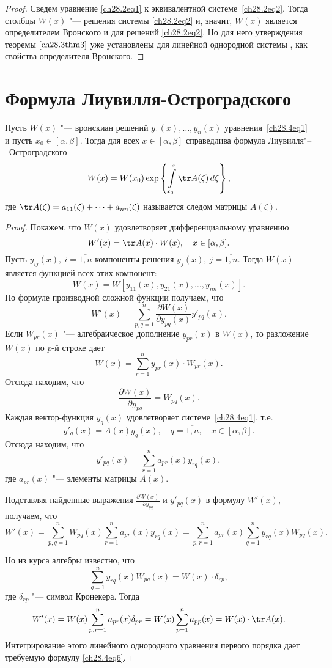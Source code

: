\begin{proof}
Сведем уравнение \eqref{ch28.2eq1} к эквивалентной системе~\eqref{ch28.2eq2}. Тогда столбцы $W(x)$ "--- решения системы \eqref{ch28.2eq2} и, значит, $W(x)$ является определителем Вронского и для решений \eqref{ch28.2eq2}. Но для него утверждения теоремы $\ref{ch28.3thm3}$ уже установлены для линейной однородной системы , как свойства определителя Вронского.
\end{proof}

\section{Формула Лиувилля-Остроградского}

\begin{thm}
Пусть $W(x)$ "--- вронскиан решений $y_1(x), \ldots, y_n(x)$ уравнения~\eqref{ch28.4eq1} и пусть $x_0 \in [\alpha, \beta]$. Тогда для всех $x \in [\alpha, \beta]$ справедлива формула Лиувилля"--~Остроградского
\begin{equation} \label{ch28.4eq6}
W(x) = W(x_0) \exp \left\lbrace \int\limits_{x_0}^{x} \tr A(\zeta) \,d\zeta \right\rbrace,
\end{equation}
где $\tr A(\zeta) = a_{11}(\zeta) + \cdots + a_{nn}(\zeta)$ называется следом матрицы $A(\zeta)$.
\end{thm}

\begin{proof}
Покажем, что $W(x)$ удовлетворяет дифференциальному уравнению
$$
W'(x) = \tr A(x) \cdot W(x), \quad x \in [\alpha, \beta].
$$
Пусть $y_{ij}(x),\ i = \overline{1,n}$ компоненты решения $y_j(x),\ j = \overline{1,n}$. Тогда $W(x)$ является функцией всех этих компонент:
$$
W(x) = W[y_{11}(x), y_{21}(x), \ldots, y_{nn}(x)].
$$
По формуле производной сложной функции получаем, что 
$$
W'(x) = \sum\limits_{p,q = 1}^{n} \frac{\partial W(x)}{\partial y_{pq}(x)} y'_{pq}(x).
$$
Если $W_{pr}(x)$ "--- алгебраическое дополнение $y_{pr}(x)$ в $W(x)$, то разложение $W(x)$ по $p$-й строке дает
$$
W(x) = \sum\limits_{r = 1}^{n} y_{pr}(x) \cdot W_{pr}(x).
$$
Отсюда находим, что 
$$
\frac{\partial W(x)}{\partial y_{pq}} = W_{pq}(x).
$$
Каждая вектор-функция $y_q(x)$ удовлетворяет системе~\eqref{ch28.4eq1}, т.е.
$$
y'_q(x) = A(x)y_q(x), \quad q = \overline{1,n}, \quad x \in [\alpha, \beta].
$$
Отсюда находим, что 
$$
y'_{pq}(x) = \sum\limits_{r = 1}^{n} a_{pr}(x)y_{rq}(x),
$$
где $a_{pr}(x)$ "--- элементы матрицы $A(x)$.

Подставляя найденные выражения $\frac{\partial W(x)}{\partial y_{pq}}$ и $y'_{pq}(x)$ в формулу $W'(x)$, получаем, что
$$
W'(x) = \sum\limits_{p,q = 1}^{n} W_{pq}(x) \sum\limits_{r = 1}^{n} a_{pr}(x)y_{rq}(x) = \sum\limits_{p,r = 1}^{n} a_{pr}(x) \sum\limits_{q = 1}^{n} y_{rq}(x) W_{pq}(x).
$$

Но из курса алгебры известно, что 
$$
\sum\limits_{q = 1}^{n}y_{rq}(x) W_{pq}(x) = W(x) \cdot \delta_{rp},
$$
где $\delta_{rp}$ "--- символ Кронекера. Тогда
$$
W'(x) = W(x) \sum\limits_{p,r = 1}^{n} a_{pr}(x) \delta_{pr} = W(x) \sum\limits_{p = 1}^{n} a_{pp}(x) = W(x) \cdot \tr A(x).
$$
Интегрирование этого линейного однородного уравнения первого порядка дает требуемую формулу \eqref{ch28.4eq6}.
\end{proof}

